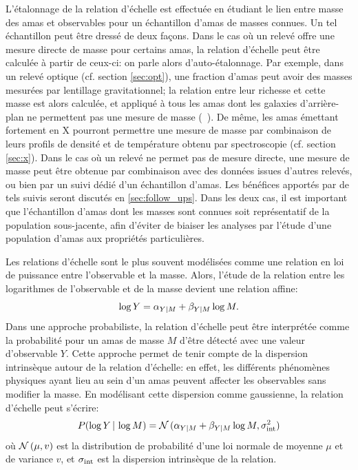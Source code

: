 L'étalonnage de la relation d'échelle est effectuée en étudiant le lien entre masse des amas et observables pour un échantillon d'amas de masses connues.
Un tel échantillon peut être dressé de deux façons.
Dans le cas où un relevé offre une mesure directe de masse pour certains amas, la relation d'échelle peut être calculée à partir de ceux-ci: on parle alors d'auto-étalonnage.
Par exemple, dans un relevé optique (cf. section \ref{sec:opt}), une fraction d'amas peut avoir des masses mesurées par lentillage gravitationnel; la relation entre leur richesse et cette masse est alors calculée, et appliqué à tous les amas dont les galaxies d'arrière-plan ne permettent pas une mesure de masse (\eg\ \cite{andreon_richness-mass_2012}).
De même, les amas émettant fortement en X pourront permettre une mesure de masse par combinaison de leurs profils de densité et de température obtenu par spectroscopie (cf. section \ref{sec:x}).
Dans le cas où un relevé ne permet pas de mesure directe, une mesure de masse peut être obtenue par combinaison avec des données issues d'autres relevés, ou bien par un suivi dédié d'un échantillon d'amas.
Les bénéfices apportés par de tels suivis seront discutés en \ref{sec:follow_ups}.
Dans les deux cas, il est important que l'échantillon d'amas dont les masses sont connues soit représentatif de la population sous-jacente, afin d'éviter de biaiser les analyses par l'étude d'une population d'amas aux propriétés particulières.

Les relations d'échelle sont le plus souvent modélisées comme une relation en loi de puissance entre l'observable et la masse.
Alors, l'étude de la relation entre les logarithmes de l'observable et de la masse devient une relation affine:
\begin{equation}
    \label{eq:scaling_noproba}
    \log Y = \alpha_{Y|M} + \beta_{Y|M} \log M.
\end{equation}
Dans une approche probabiliste, la relation d'échelle peut être interprétée comme la probabilité pour un amas de masse $M$ d'être détecté avec une valeur d'observable $Y$.
Cette approche permet de tenir compte de la dispersion intrinsèque autour de la relation d'échelle: en effet, les différents phénomènes physiques ayant lieu au sein d'un amas peuvent affecter les observables sans modifier la masse.
En modélisant cette dispersion comme gaussienne, la relation d'échelle peut s'écrire:
\begin{equation}
    \label{eq:scaling_pdf}
    P(\log Y \,|\, \log M) = \mathcal{N}\,(\alpha_{Y|M} + \beta_{Y|M} \log M, \sigma_{\rm int}^2)
\end{equation}
où $\mathcal{N}\,(\mu, v)$ est la distribution de probabilité d'une loi normale de moyenne $\mu$ et de variance $v$, et $\sigma_{\rm int}$ est la dispersion intrinsèque de la relation.

